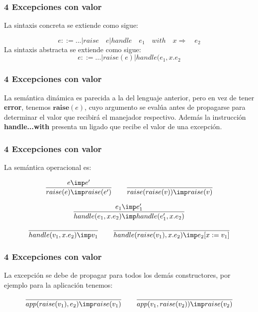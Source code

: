 \documentclass[xcolor=dvipsnames,table,spanish]{beamer}
\begin{document}
\begin{frame}
\frametitle{4 Excepciones con valor}
La sintaxis concreta se extiende como sigue:

\[e::=...|raise \quad e|handle \quad e_1 \quad with \quad x \Rightarrow \quad e_2\]
\newline
La sintaxis abstracta se extiende como sigue:
\[e::=...|raise(e)|handle(e_1,x.e_2\]
\end{frame}
\begin{frame}
\frametitle{4 Excepciones con valor}
La semántica dinámica es parecida a la del lenguaje anterior, pero en vez de tener \textbf{error}, tenemos $\textbf{raise}(e)$, cuyo argumento se evalúa antes de propagarse para determinar el valor que recibirá el manejador respectivo. Además la instrucción \textbf{handle...with} presenta un ligado que recibe el valor de una excepción.
\end{frame}
\begin{frame}
\frametitle{4 Excepciones con valor}
La semántica operacional es:
\begin{center}

      \begin{equation*}
         \frac{e \imp e'}{raise(e) \imp raise(e')}
         \qquad
           \frac{}{raise(raise(v)) \imp raise(v)}
	  \end{equation*}

      \begin{equation*}
         \frac{e_1 \imp e_1'}{handle(e_1,x.e_2)\imp handle(e_1',x.e_2)}
	  \end{equation*}

      \begin{equation*}
         \frac{}{handle(v_1,x.e_2) \imp v_1}
         \qquad
           \frac{}{handle(raise(v_1),x.e_2) \imp e_2[x:=v_1]}
	  \end{equation*}
  \end{center}
\end{frame}
\begin{frame}
\frametitle{4 Excepciones con valor}
La excepción se debe de propagar para todos los demás constructores, por ejemplo para la aplicación tenemos:

\begin{center}

      \begin{equation*}
         \frac{}{app(raise(v_1),e_2) \imp raise(v_1)}
         \qquad
           \frac{}{app(v_1,raise(v_2)) \imp raise(v_2)}
	  \end{equation*}

  \end{center}
\end{frame}
\end{document}

